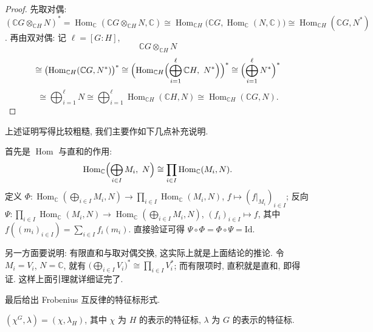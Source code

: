 \begin{proof}
先取对偶: $(\mathbb{C}G\otimes_{\mathbb{C}H}N)^*=\operatorname{Hom}_{\mathbb{C}}(\mathbb{C}G\otimes_{\mathbb{C}H}N,\mathbb{C})
\cong\operatorname{Hom}_{\mathbb{C}H}\bigl(\mathbb{C}G,\operatorname{Hom}_{\mathbb{C}}(N,\mathbb{C})\bigr)
\cong\operatorname{Hom}_{\mathbb{C}H}(\mathbb{C}G,N^*)$.
再由双对偶: 记 $\ell=[G:H]$,
\[
  \mathbb{C}G\otimes_{\mathbb{C}H}N
\]
\[
  \cong\bigl(\operatorname{Hom}_{\mathbb{C}H}(\mathbb{C}G,N^*)\bigr)^*
  \cong\Bigl(\operatorname{Hom}_{\mathbb{C}H}\Bigl(\bigoplus_{i=1}^{\ell}\mathbb{C}H,\ N^*\Bigr)\Bigr)^*
  \cong\Bigl(\bigoplus_{i=1}^{\ell}N^*\Bigr)^*
\]
\[
  \cong\bigoplus_{i=1}^{\ell}N\cong\bigoplus_{i=1}^{\ell}\operatorname{Hom}_{\mathbb{C}H}(\mathbb{C}H,N)
  \cong\operatorname{Hom}_{\mathbb{C}H}(\mathbb{C}G,N).
\]
\end{proof}

\begin{remark}\label{rem:induction-proof-supplement}
上述证明写得比较粗糙, 我们主要作如下几点补充说明.

\sloppy
首先是 $\operatorname{Hom}$ 与直和的作用:
\[
  \operatorname{Hom}_{\mathbb{C}}\Bigl(\bigoplus_{i\in I}M_i,\ N\Bigr)\cong\prod_{i\in I}\operatorname{Hom}_{\mathbb{C}}(M_i,N).
\]
定义 $\Phi\colon\operatorname{Hom}_{\mathbb{C}}(\bigoplus_{i\in I}M_i,N)\to\prod_{i\in I}\operatorname{Hom}_{\mathbb{C}}(M_i,N)$,
$f\longmapsto(f|_{M_i})_{i\in I}$;
反向 $\Psi\colon\prod_{i\in I}\operatorname{Hom}_{\mathbb{C}}(M_i,N)\to\operatorname{Hom}_{\mathbb{C}}(\bigoplus_{i\in I}M_i,N)$,
$(f_i)_{i\in I}\longmapsto f$, 其中 $f((m_i)_{i\in I})=\sum_{i\in I}f_i(m_i)$.
直接验证可得 $\Psi\circ\Phi=\Phi\circ\Psi=\mathrm{Id}$.

另一方面要说明: 有限直和与取对偶交换, 这实际上就是上面结论的推论.
令 $M_i=V_i$, $N=\mathbb{C}$, 就有 $\bigl(\bigoplus_{i\in I}V_i\bigr)^*\cong\prod_{i\in I}V_i^*$;
而有限项时, 直积就是直和, 即得证. 这样上面引理就详细证完了.
\fussy
\end{remark}

最后给出 Frobenius 互反律的特征标形式.

\begin{corollary}\label{cor:frobenius-character}
$(\chi^G,\lambda)=(\chi,\lambda_H)$, 其中 $\chi$ 为 $H$ 的表示的特征标, $\lambda$ 为 $G$ 的表示的特征标.
\end{corollary}
